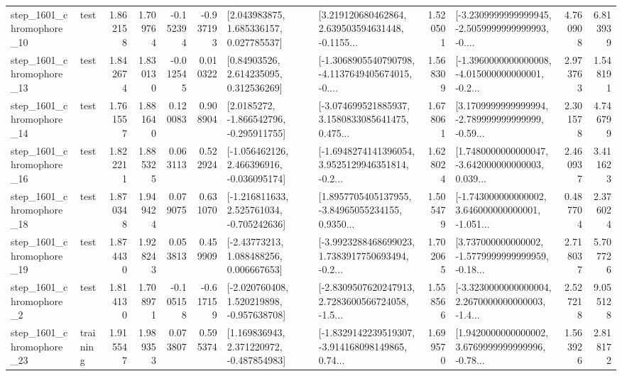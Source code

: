 \begin{tabular}{llrrrrllrlrr}
 step\_1601\_chromophore\_10 &      test &      1.862158 &    1.709764 &     -0.152394 & -0.937193 &     [2.043983875, 1.685336157, 0.027785537] &  [3.219120680462864, 2.639503594631448, -0.1155... &       1.520501 &  [-3.2309999999999945, -2.5059999999999993, -0.... &            4.760908 &          6.813939 \\
 step\_1601\_chromophore\_13 &      test &      1.842674 &    1.830130 &     -0.012545 &  0.010322 &      [0.84903526, 2.614235095, 0.312536269] &  [-1.3068905540790798, -4.1137649405674015, -0.... &       1.568309 &  [-1.3960000000000008, -4.015000000000001, -0.2... &            2.973763 &          1.548191 \\
 step\_1601\_chromophore\_14 &      test &      1.761557 &    1.881640 &      0.120083 &  0.908904 &     [2.0185272, -1.866542796, -0.295911755] &  [-3.074699521885937, 3.1580833085641475, 0.475... &       1.678061 &  [3.1709999999999994, -2.789999999999999, -0.59... &            2.301578 &          4.746799 \\
 step\_1601\_chromophore\_16 &      test &      1.822211 &    1.885325 &      0.063113 &  0.522924 &   [-1.056462126, 2.466396916, -0.036095174] &  [-1.6948274141396054, 3.9525129946351814, -0.2... &       1.628024 &  [1.7480000000000047, -3.642000000000003, 0.039... &            2.460937 &          3.411623 \\
 step\_1601\_chromophore\_18 &      test &      1.870348 &    1.949424 &      0.079075 &  0.631070 &   [-1.216811633, 2.525761034, -0.705242636] &  [1.8957705405137955, -3.84965055234155, 0.9350... &       1.505479 &  [-1.743000000000002, 3.646000000000001, -1.051... &            0.487704 &          2.376024 \\
 step\_1601\_chromophore\_19 &      test &      1.874430 &    1.928243 &      0.053813 &  0.459909 &     [-2.43773213, 1.088488256, 0.006667653] &  [-3.9923288468699023, 1.7383917750693494, -0.2... &       1.702065 &  [3.737000000000002, -1.5779999999999959, -0.18... &            2.718037 &          5.707726 \\
  step\_1601\_chromophore\_2 &      test &      1.814130 &    1.708971 &     -0.105158 & -0.617159 &   [-2.020760408, 1.520219898, -0.957638708] &  [-2.8309507620247913, 2.7283600566724058, -1.5... &       1.558566 &  [-3.3230000000000004, 2.2670000000000003, -1.4... &            2.527218 &          9.055128 \\
 step\_1601\_chromophore\_23 &  training &      1.915547 &    1.989353 &      0.073807 &  0.595374 &    [1.169836943, 2.371220972, -0.487854983] &  [-1.8329142239519307, -3.914168098149865, 0.74... &       1.699570 &  [1.9420000000000002, 3.6769999999999996, -0.78... &            1.563926 &          2.818172 \\

\end{tabular}
